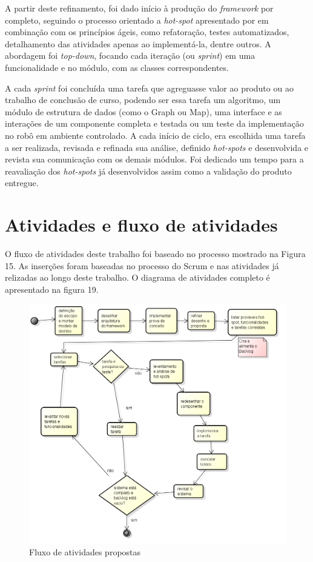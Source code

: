 A partir deste refinamento, foi dado início à produção do \textit{framework} por completo, seguindo o processo orientado a \textit{hot-spot} apresentado por \cite{Fayad1999} em combinação com os princípios ágeis, como refatoração, testes automatizados, detalhamento das atividades apenas ao implementá-la, dentre outros. A abordagem foi \textit{top-down}, focando cada iteração (ou \textit{sprint}) em uma funcionalidade e no módulo, com as classes correspondentes.

A cada \textit{sprint} foi concluída uma tarefa que agreguasse valor ao produto ou ao trabalho de conclusão de curso, podendo ser essa tarefa um algoritmo, um módulo de estrutura de dados (como o Graph ou Map), uma interface e as interações de um componente completa e testada ou um teste da implementação no robô em ambiente controlado. A cada início de ciclo, era escolhida uma tarefa a ser realizada, revisada e refinada sua análise, definido \textit{hot-spots} e desenvolvida e revista sua comunicação com os demais módulos. Foi dedicado um tempo para a reavaliação dos \textit{hot-spots} já desenvolvidos assim como a validação do produto entregue.

\section{Atividades e fluxo de atividades}

O fluxo de atividades deste trabalho foi baseado no processo mostrado na Figura 15. As inserções foram baseadas no processo do Scrum e nas atividades já relizadas ao longo deste trabalho. O diagrama de atividades completo é apresentado na figura 19.

\begin{figure}[h]
	\centering
	\label{fig19}
		\includegraphics[keepaspectratio=true,scale=0.68]{figuras/fluxoatvd.png}
	\caption{Fluxo de atividades propostas}
\end{figure}

